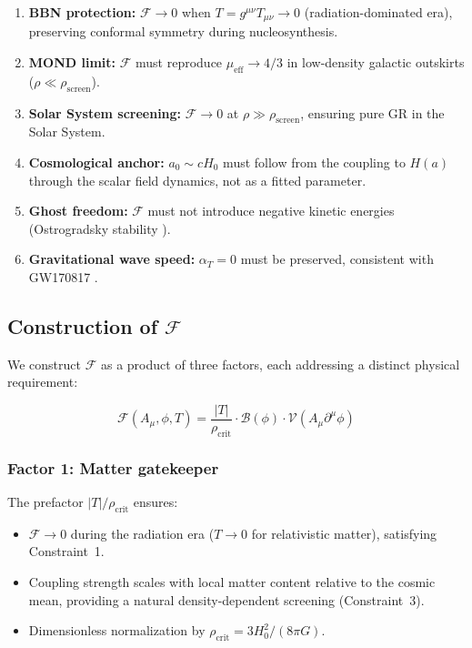 \documentclass[aps,prd,twocolumn,superscriptaddress,nofootinbib]{revtex4-2}
\begin{document}
\begin{enumerate}
\item \textbf{BBN protection:} $\mathcal{F} \to 0$ when $T = g^{\mu\nu}T_{\mu\nu} \to 0$ (radiation-dominated era), preserving conformal symmetry during nucleosynthesis.

\item \textbf{MOND limit:} $\mathcal{F}$ must reproduce $\mu_{\mathrm{eff}} \to 4/3$ in low-density galactic outskirts ($\rho \ll \rho_{\mathrm{screen}}$).

\item \textbf{Solar System screening:} $\mathcal{F} \to 0$ at $\rho \gg \rho_{\mathrm{screen}}$, ensuring pure GR in the Solar System.

\item \textbf{Cosmological anchor:} $a_0 \sim cH_0$ must follow from the coupling to $H(a)$ through the scalar field dynamics, not as a fitted parameter.

\item \textbf{Ghost freedom:} $\mathcal{F}$ must not introduce negative kinetic energies (Ostrogradsky stability \cite{Woodard2015}).

\item \textbf{Gravitational wave speed:} $\alpha_T = 0$ must be preserved, consistent with GW170817 \cite{Abbott2017}.
\end{enumerate}

\subsection{Construction of $\mathcal{F}$}
\label{sec:construction}

We construct $\mathcal{F}$ as a product of three factors, each addressing a distinct physical requirement:

\begin{equation}
\mathcal{F}(A_\mu, \phi, T) = \frac{|T|}{\rho_{\mathrm{crit}}} \cdot \mathcal{B}(\phi) \cdot \mathcal{V}(A_\mu \partial^\mu \phi)
\label{eq:coupling}
\end{equation}

\subsubsection{Factor 1: Matter gatekeeper}

The prefactor $|T|/\rho_{\mathrm{crit}}$ ensures:
\begin{itemize}
\item $\mathcal{F} \to 0$ during the radiation era ($T \to 0$ for relativistic matter), satisfying Constraint~1.
\item Coupling strength scales with local matter content relative to the cosmic mean, providing a natural density-dependent screening (Constraint~3).
\item Dimensionless normalization by $\rho_{\mathrm{crit}} = 3H_0^2/(8\pi G)$.
\end{itemize}
\end{document}

